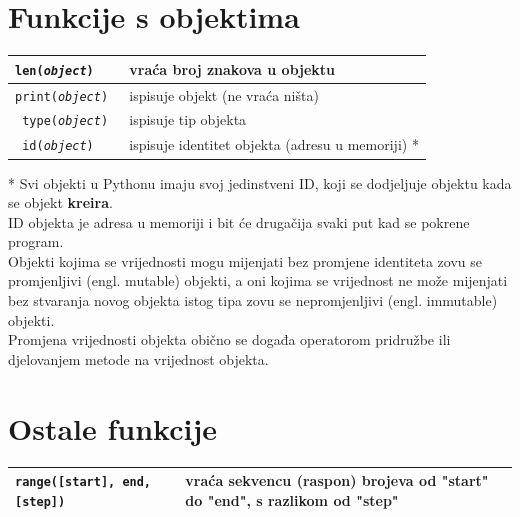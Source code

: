 \documentclass[10pt]{article}
\begin{document}
    \section*{\color{NavyBlue} Funkcije s objektima}
    \begin{tabular}{|>{\tt}p{9.00cm}|>{}p{15.50cm}|}
        \hline
        len(\textit{object}) & vraća broj znakova u objektu
        \\ \hline
        print(\textit{object}) & ispisuje objekt (ne vraća ništa)
        \\ \hline
        type(\textit{object}) & ispisuje tip objekta
        \\ \hline
        id(\textit{object}) & ispisuje identitet objekta (adresu u memoriji) *
        \\ \hline
    \end{tabular}
    \begin{center}
        \footnotesize
        * Svi objekti u Pythonu imaju svoj jedinstveni ID, koji se dodjeljuje objektu kada se objekt \textbf{kreira}. \\
        ID objekta je adresa u memoriji i bit će drugačija svaki put kad se pokrene program. \\
        Objekti kojima se vrijednosti mogu mijenjati bez promjene identiteta zovu se promjenljivi (engl. mutable) objekti, a oni kojima se vrijednost ne može mijenjati bez stvaranja novog objekta istog tipa zovu se nepromjenljivi (engl. immutable) objekti. \\
        Promjena vrijednosti objekta obično se događa operatorom pridružbe ili djelovanjem metode na vrijednost objekta. \\
    \end{center}

    \section*{\color{NavyBlue} Ostale funkcije}
    \begin{tabular}{|>{\tt}p{9.00cm}|>{}p{15.50cm}|}
        \hline
        range([start], end, [step]) & vraća sekvencu (raspon) brojeva od "start" do "end", s razlikom od "step"
        \\ \hline
    \end{tabular}
\end{document}
